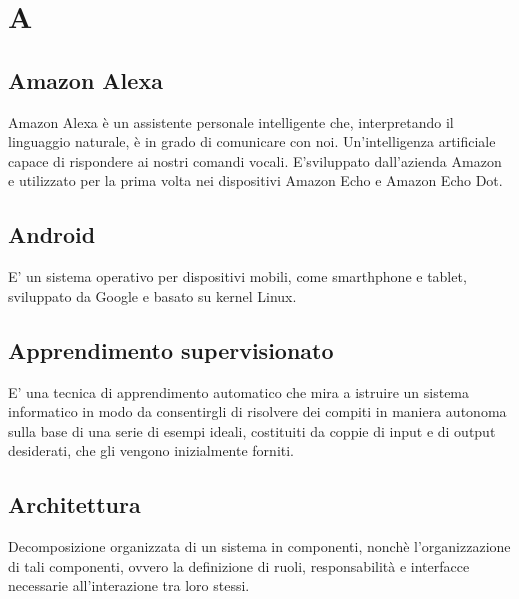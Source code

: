 \section*{A}

\subsection{Amazon Alexa}
Amazon Alexa è un assistente personale intelligente che, interpretando il linguaggio naturale, è in grado di comunicare con noi. Un’intelligenza artificiale capace di rispondere ai nostri comandi vocali. E'sviluppato dall'azienda Amazon e utilizzato per la prima volta nei dispositivi Amazon Echo e Amazon Echo Dot.

\subsection{Android}
E' un sistema operativo per dispositivi mobili, come smarthphone e tablet, sviluppato da Google e basato su kernel Linux.

\subsection{Apprendimento supervisionato}
E' una tecnica di apprendimento automatico che mira a istruire un sistema informatico in modo da consentirgli di risolvere dei compiti in maniera autonoma sulla base di una serie di esempi ideali, costituiti da coppie di input e di output desiderati, che gli vengono inizialmente forniti.

\subsection{Architettura}
Decomposizione organizzata di un sistema in componenti, nonchè l'organizzazione di tali componenti, ovvero la definizione di ruoli, responsabilità e interfacce necessarie all'interazione tra loro stessi.